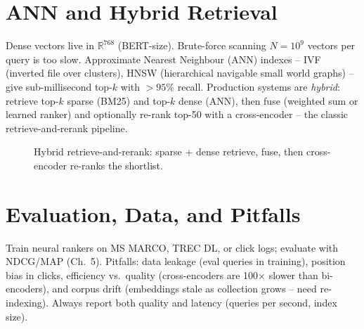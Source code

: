 \section{ANN and Hybrid Retrieval}\label{sec:ann}
Dense vectors live in $\mathbb{R}^{768}$ (BERT-size). Brute-force scanning $N=10^9$ vectors per query is too slow. Approximate Nearest Neighbour (ANN) indexes -- IVF (inverted file over clusters), HNSW (hierarchical navigable small world graphs) -- give sub-millisecond top-$k$ with $>95\%$ recall. Production systems are \emph{hybrid}: retrieve top-$k$ sparse (BM25) and top-$k$ dense (ANN), then fuse (weighted sum or learned ranker) and optionally re-rank top-50 with a cross-encoder -- the classic retrieve-and-rerank pipeline.

\begin{figure}[h]\centering
{}
\caption{Hybrid retrieve-and-rerank: sparse + dense retrieve, fuse, then cross-encoder re-ranks the shortlist.}
\label{fig:hybrid}
\end{figure}

\section{Evaluation, Data, and Pitfalls}\label{sec:eval-neural}
Train neural rankers on MS MARCO, TREC DL, or click logs; evaluate with NDCG/MAP (Ch.~5). Pitfalls: data leakage (eval queries in training), position bias in clicks, efficiency vs.\ quality (cross-encoders are 100$\times$ slower than bi-encoders), and corpus drift (embeddings stale as collection grows -- need re-indexing). Always report both quality and latency (queries per second, index size).

